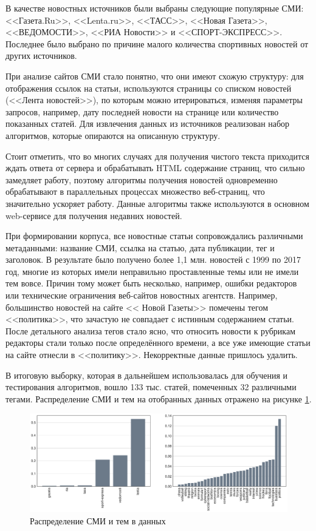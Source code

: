 \documentclass[a4paper, 14pt]{extarticle}
\begin{document}
В качестве новостных источников были выбраны следующие популярные СМИ:
<<Газета.Ru>>, <<Lenta.ru>>, <<ТАСС>>, <<Новая Газета>>, <<ВЕДОМОСТИ>>, <<РИА Новости>> и <<СПОРТ-ЭКСПРЕСС>>.
Последнее было выбрано по причине малого количества спортивных новостей от других источников.

При анализе сайтов СМИ стало понятно, что они имеют схожую структуру: для отображения ссылок на статьи,
используются страницы со списком новостей (<<Лента новостей>>), по которым можно итерироваться,
изменяя параметры запросов, например, дату последней новости на странице или количество показанных статей.
Для извлечения данных из источников реализован набор алгоритмов, которые опираются на описанную структуру.

Стоит отметить, что во многих случаях для получения чистого текста приходится ждать ответа от сервера и обрабатывать 
HTML содержание страниц, что сильно замедляет работу, поэтому алгоритмы получения новостей одновременно обрабатывают
в параллельных процессах множество веб-страниц, что значительно ускоряет работу. Данные алгоритмы также используются в основном
web-сервисе для получения недавних новостей.

При формировании корпуса, все новостные статьи сопровождались различными метаданными: название СМИ, ссылка на статью,
дата публикации, тег и заголовок. В результате было получено более 1,1 млн. новостей с 1999 по 2017 год, многие из 
которых имели неправильно проставленные темы или не имели тем вовсе. Причин тому может быть несколько, например,
ошибки редакторов или технические ограничения веб-сайтов новостных агентств. Например, большинство новостей на сайте <<
Новой Газеты>> помечены тегом <<политика>>, что зачастую не совпадает с истинным содержанием статьи. После детального анализа тегов 
стало ясно, что относить новости к рубрикам редакторы стали только после определённого времени, а все уже имеющие 
статьи на сайте отнесли в <<политику>>. Некорректные данные пришлось удалить.

В итоговую выборку, которая в дальнейшем использовалась для обучения и тестирования алгоритмов,
вошло 133 тыс. статей, помеченных 32 различными тегами. Распределение СМИ и тем на отобранных данных отражено на 
рисунке \ref{media_topic_distr}.
\begin{figure}[h!]
	\centering
	\includegraphics[width=1\textwidth]{media_topi_distr.pdf}
	\caption{Распределение СМИ и тем в данных}
	\label{media_topic_distr}
\end{figure}
\end{document}
